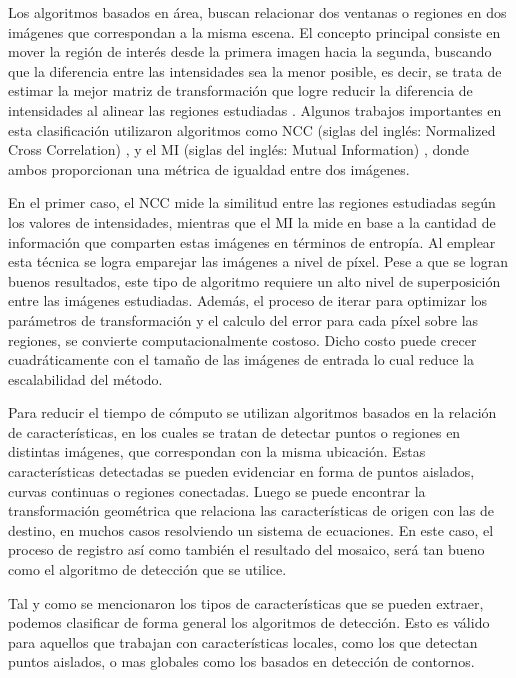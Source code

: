 
Los algoritmos basados en área, buscan relacionar dos ventanas o regiones en dos imágenes que correspondan a la misma escena. El concepto principal consiste en mover la región de interés desde la primera imagen hacia la segunda, buscando que la diferencia entre las intensidades sea la menor posible, es decir,  se trata de estimar la mejor matriz de transformación que logre reducir la diferencia de intensidades al alinear las regiones estudiadas \cite{nccvsmi}. Algunos trabajos importantes en esta clasificación utilizaron algoritmos como NCC (siglas del inglés: Normalized Cross Correlation) \cite{ncc}, y el MI (siglas del inglés: Mutual Information) \cite{mi}, donde ambos proporcionan una métrica de igualdad entre dos imágenes.

En el primer caso, el NCC mide la similitud entre las regiones estudiadas según los valores de intensidades, mientras que el MI la mide en base a la cantidad de información que comparten estas imágenes en términos de entropía. Al emplear esta técnica se logra emparejar las imágenes a nivel de píxel. Pese a que se logran buenos resultados, este tipo de algoritmo requiere un alto nivel de superposición entre las imágenes estudiadas. Además, el proceso de iterar para optimizar los parámetros de transformación y el calculo del error para cada píxel sobre las regiones, se convierte computacionalmente costoso. Dicho costo puede crecer cuadráticamente con el tamaño de las imágenes de entrada lo cual reduce la escalabilidad del método.



Para reducir el tiempo de cómputo se utilizan algoritmos basados en la relación de características, en los cuales se tratan de detectar puntos o regiones en distintas imágenes, que correspondan con la misma ubicación. Estas características detectadas se pueden evidenciar en forma de puntos aislados, curvas continuas o regiones conectadas. Luego se puede encontrar la transformación geométrica que relaciona las características de origen con las de destino, en muchos casos resolviendo un sistema de ecuaciones. En este caso, el proceso de registro así como también el resultado del mosaico, será tan bueno como el algoritmo de detección que se utilice.

Tal y como se mencionaron los tipos de características que se pueden extraer, podemos clasificar de forma general los algoritmos de detección. Esto es válido para aquellos que trabajan con características locales, como los que detectan puntos aislados, o mas globales como los basados en detección de contornos.

